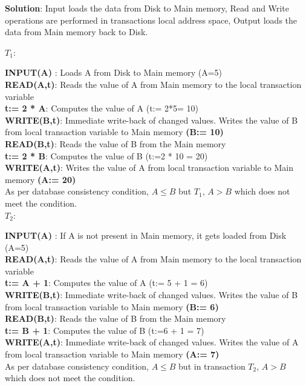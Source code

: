 \begin{enumerate}
\textbf{Solution}: Input loads the data from Disk to Main memory, Read and Write operations are performed in transactions local address space, Output loads the data from Main memory back to Disk.

$T_1: $ 

  \textbf{INPUT(A)} : Loads A from Disk to Main memory (A=5)\\
  \textbf{READ(A,t)}: Reads the value of A from Main memory to the local transaction variable \\
  \textbf{t:= 2 * A}: Computes the value of A (t:= 2*5= 10)\\
  \textbf{WRITE(B,t)}: Immediate write-back of changed values. Writes the value of B from local transaction variable to Main memory \textbf{(B:= 10)}\\
  \textbf{READ(B,t)}: Reads the value of B from the Main memory \\
  \textbf{t:= 2 * B}: Computes the value of B (t:=2 * 10 = 20)\\
  \textbf{WRITE(A,t)}: Writes the value of A from local transaction variable to Main memory \textbf{(A:= 20)}\\
  As per database consistency condition, $A \leq B$ but $T_1$, $A > B$ which does not meet the condition.\\
 
$T_2: $ 

  \textbf{INPUT(A)} : If A is not present in Main memory, it gets loaded from Disk (A=5)\\
  \textbf{READ(A,t)}: Reads the value of A from Main memory to the local transaction variable \\
  \textbf{t:= A + 1}: Computes the value of A (t:= 5 + 1 = 6)\\
  \textbf{WRITE(B,t)}: Immediate write-back of changed values. Writes the value of B from local transaction variable to Main memory \textbf{(B:= 6)}\\
  \textbf{READ(B,t)}: Reads the value of B from the Main memory\\
  \textbf{t:= B + 1}: Computes the value of B (t:=6 + 1 = 7)\\
  \textbf{WRITE(A,t)}: Immediate write-back of changed values. Writes the value of A from local transaction variable to Main memory \textbf{(A:= 7)}\\
  As per database consistency condition, $A \leq B$ but in transaction $T_2$, $A > B$ which does not meet the condition.\\


\end{enumerate}
